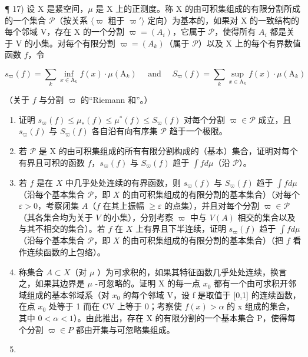 ¶ 17) 设 X 是紧空间，\(\mu\) 是 X 上的正测度。称 X 的由可积集组成的有限分割所成的一个集合 \(\mathcal{P}\)（按关系 \(\langle\varpi\) 粗于 \(\varpi'\rangle\) 定向）为基本的，如果对 X 的一致结构的每个邻域 V，存在 X 的一个分割 \(\varpi = (A_i)\)，它属于 \(\mathcal{P}\)，使得所有 \(A_i\) 都是关于 V 的小集。对每个有限分割 \(\varpi = (A_k)\)（属于 \(\mathcal{P}\)）以及 X 上的每个有界数值函数 \(f\)，令

\[
s _ {\varpi} (f) = \sum_ {k} \inf _ {x \in \mathrm{A} _ {k}} f (x) \cdot \mu (\mathrm{A} _ {k}) \quad \text { and } \quad S _ {\varpi} (f) = \sum_ {k} \sup _ {x \in \mathrm{A} _ {k}} f (x) \cdot \mu (\mathrm{A} _ {k})
\]

（关于 \(f\) 与分割 \(\varpi\) 的“Riemann 和”。）

\begin{enumerate}
\def\labelenumi{\alph{enumi})}
\item
  证明 \(s_{\varpi}(f) \leqslant \mu_{*}(f) \leqslant \mu^{*}(f) \leqslant S_{\varpi}(f)\) 对每个分割 \(\varpi \in \mathcal{P}\) 成立，且 \(s_{\varpi}(f)\) 与 \(S_{\varpi}(f)\) 各自沿有向有序集 \(\mathcal{P}\) 趋于一个极限。
\item
  若 \(\mathcal{P}\) 是 X 的由可积集组成的所有有限分割构成的（基本）集合，证明对每个有界且可积的函数 \(f\)，\(s_{\varpi}(f)\) 与 \(S_{\varpi}(f)\) 趋于 \(\int f d\mu\)（沿 \(\mathcal{P}\)）。
\item
  若 \(f\) 是在 \(X\) 中几乎处处连续的有界函数，则 \(s_{\varpi}(f)\) 与 \(S_{\varpi}(f)\) 趋于 \(\int f d\mu\)（沿每个基本集合 \(\mathcal{P}\)，即 \(X\) 的由可积集组成的有限分割的基本集合）（对每个 \(\varepsilon > 0\)，考察闭集 \(A\)（\(f\) 在其上振幅 \(\geqslant \varepsilon\) 的点集），并且对每个分割 \(\varpi \in \mathcal{P}\)（其各集合均为关于 \(V\) 的小集），分别考察 \(\varpi\) 中与 \(V(A)\) 相交的集合以及与其不相交的集合）。若 \(f\) 在 \(X\) 上有界且下半连续，证明 \(s_{\varpi}(f)\) 趋于 \(\int f d\mu\)（沿每个基本集合 \(\mathcal{P}\)，即 \(X\) 的由可积集组成的有限分割的基本集合）（把 \(f\) 看作连续函数的上包络）。
\item
  称集合 \(A \subset X\)（对 \(\mu\) ）为可求积的，如果其特征函数几乎处处连续，换言之，如果其边界是 \(\mu\) -可忽略的。证明 X 的每一点 \(x_{0}\) 都有一个由可求积开邻域组成的基本邻域系（对 \(x_{0}\) 的每个邻域 V，设 f 是取值于 {[}0,1{]} 的连续函数，在点 \(x_{0}\) 处等于 1 而在 CV 上等于 0；考察使 \(f(x) > \alpha\) 的 x 组成的集合，其中 \(0 < \alpha < 1\)）。由此推出，存在 X 的有限分割的一个基本集合 P，使得每个分割 \(\varpi \in P\) 都由开集与可忽略集组成。
\item

\end{enumerate}

